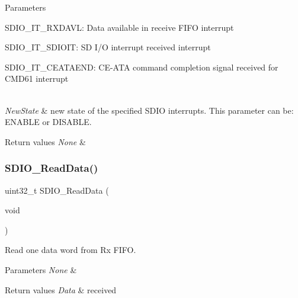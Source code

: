 \begin{DoxyParams}{Parameters}
\begin{DoxyItemize}
S\+D\+I\+O\+\_\+\+I\+T\+\_\+\+R\+X\+D\+A\+VL\+: Data available in receive F\+I\+FO interrupt \item S\+D\+I\+O\+\_\+\+I\+T\+\_\+\+S\+D\+I\+O\+IT\+: SD I/O interrupt received interrupt \item S\+D\+I\+O\+\_\+\+I\+T\+\_\+\+C\+E\+A\+T\+A\+E\+ND\+: C\+E-\/\+A\+TA command completion signal received for C\+M\+D61 interrupt \end{DoxyItemize}
\\
\hline
{\em New\+State} & new state of the specified S\+D\+IO interrupts. This parameter can be\+: E\+N\+A\+B\+LE or D\+I\+S\+A\+B\+LE. \\
\hline
\end{DoxyParams}

\begin{DoxyRetVals}{Return values}
{\em None} & \\
\hline
\end{DoxyRetVals}
\mbox{\label{group___s_d_i_o___private___functions_ga4e8ac755ef3c31ecd4ed2708df19187e}} 
\subsubsection{\texorpdfstring{SDIO\_ReadData()}{SDIO\_ReadData()}}
{\footnotesize\ttfamily uint32\+\_\+t S\+D\+I\+O\+\_\+\+Read\+Data (\begin{DoxyParamCaption}\item[{void}]{ }\end{DoxyParamCaption})}



Read one data word from Rx F\+I\+FO. 


\begin{DoxyParams}{Parameters}
{\em None} & \\
\hline
\end{DoxyParams}

\begin{DoxyRetVals}{Return values}
{\em Data} & received \\
\hline
\end{DoxyRetVals}
\mbox{\label{group___s_d_i_o___private___functions_ga8dc7f17804bdb745b42f6647c8487b4c}} 
